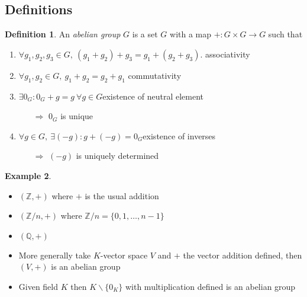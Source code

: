 \documentclass[a4paper]{article}
\theoremstyle{definition}
\newtheorem{defn}{Definition}[subsection]
\newtheorem{example}[defn]{Example}
\begin{document}
\subsection{Definitions}
\begin{defn}
An \textit{abelian group} $G$ is a set $G$ with a map $+:G\times G\rightarrow G$ such that
\begin{enumerate}
    \item $\forall g_1,g_2,g_3 \in G,\ (g_1+g_2)+g_3 = g_1+(g_2+g_3).$ \qquad associativity
    \item $\forall g_1,g_2\in G,\ g_1+g_2=g_2+g_1$ \qquad commutativity
    \item $\exists 0_G:0_G+g=g \ \forall g\in G$\qquad existence of neutral element
    \begin{itemize}
        \item[$\Rightarrow$] $0_G$ is unique
    \end{itemize}
    \item $\forall g\in G,\ \exists (-g):g+(-g)=0_G$\qquad existence of inverses
    \begin{itemize}
        \item[$\Rightarrow$] $(-g)$ is uniquely determined
    \end{itemize}
\end{enumerate}
\end{defn}
\begin{example}
\begin{itemize}
    \item $(\mathbb Z,+)$ where $+$ is the usual addition
    \item $(\mathbb Z/n,+)$ where $\mathbb Z/n = \{0,1,\ldots,n-1\}$
    \item $(\mathbb Q,+)$
    \item More generally take $K$-vector space $V$ and $+$ the vector addition defined, then $(V,+)$ is an abelian group
    \item Given field $K$ then $K\backslash \{0_K\}$ with multiplication defined is an abelian group
\end{itemize}
\end{example}
\end{document}
